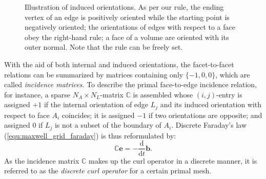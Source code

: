 \documentclass{article}
\begin{document}
\begin{figure}
    \caption{Illustration of induced orientations. As per our rule, the ending vertex of an edge is positively oriented while the starting point is negatively oriented; the orientations of edges with respect to a face obey the right-hand rule; a face of a volume are oriented with its outer normal. Note that the rule can be freely set.}
    \label{fig:illustration_external_orientation}
\end{figure}

With the aid of both internal and induced orientations, the facet-to-facet relations can be summarized by matrices containing only $\{-1,0,0\}$, which are called \emph{incidence matrices}. To describe the primal face-to-edge incidence relation, for instance, a sparse $N_A \times N_L$-matrix $\mathbb{C}$ is assembled whose $(i,j)$-entry is assigned $+1$ if the internal orientation of edge $L_j$ and its induced orientation with respect to face $A_i$ coincides; it is assigned $-1$ if two orientations are opposite; and assigned $0$ if $L_j$ is not a subset of the boundary of $A_i$. Discrete Faraday's law (\ref{equ:maxwell_grid_faraday}) is thus reformulated by:
\begin{equation*}
    \mathbb{C}\mathbf{e} = - \frac{\text{d}}{\text{d}t} \mathbf{b}.
\end{equation*}
As the incidence matrix $\mathbb{C}$ makes up the curl operator in a discrete manner, it is referred to as the \emph{discrete curl operator} for a certain primal mesh.
\end{document}

